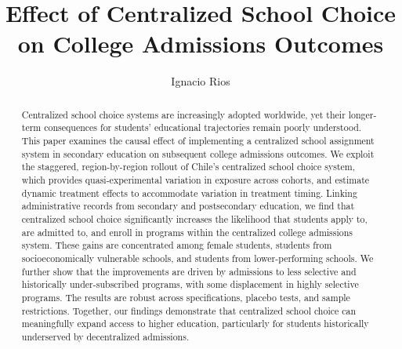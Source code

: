 \documentclass[11pt]{article}
\title{Effect of Centralized School Choice on College Admissions Outcomes}
\author{Ignacio Rios}
\date{}
\begin{document}
\maketitle

\begin{abstract}
Centralized school choice systems are increasingly adopted worldwide, yet their longer-term consequences for students' educational trajectories remain poorly understood. This paper examines the causal effect of implementing a centralized school assignment system in secondary education on subsequent college admissions outcomes. We exploit the staggered, region-by-region rollout of Chile's centralized school choice system, which provides quasi-experimental variation in exposure across cohorts, and estimate dynamic treatment effects to accommodate variation in treatment timing. Linking administrative records from secondary and postsecondary education, we find that centralized school choice significantly increases the likelihood that students apply to, are admitted to, and enroll in programs within the centralized college admissions system. These gains are concentrated among female students, students from socioeconomically vulnerable schools, and students from lower-performing schools. We further show that the improvements are driven by admissions to less selective and historically under-subscribed programs, with some displacement in highly selective programs. The results are robust across specifications, placebo tests, and sample restrictions. Together, our findings demonstrate that centralized school choice can meaningfully expand access to higher education, particularly for students historically underserved by decentralized admissions.
\end{abstract}

\end{document}
